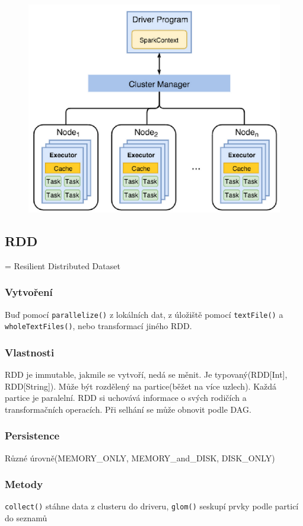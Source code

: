 \begin{figure}
    \centering
    \includegraphics[scale=0.5]{pict/SparkArch.png}
\end{figure}
\subsection{RDD}
= Resilient Distributed Dataset
\subsubsection{Vytvoření}
Buď pomocí \texttt{parallelize()} z lokálních dat, z úložiště pomocí \texttt{textFile()} a \texttt{wholeTextFiles()}, nebo transformací jiného RDD. 

\subsubsection{Vlastnosti}
 RDD je immutable, jakmile se vytvoří, nedá se měnit. Je typovaný(RDD[Int], RDD[String]). Může být rozdělený na partice(běžet na více uzlech). Každá partice je paralelní. RDD si uchovává informace o
 svých rodičích a transformačních operacích. Při selhání se může obnovit podle DAG.

\subsubsection{Persistence}
Různé úrovně(MEMORY\_ONLY, MEMORY\_and\_DISK, DISK\_ONLY)

\subsubsection{Metody}
\texttt{collect()} stáhne data z clusteru do driveru, \texttt{glom()} seskupí prvky podle particí do seznamů

